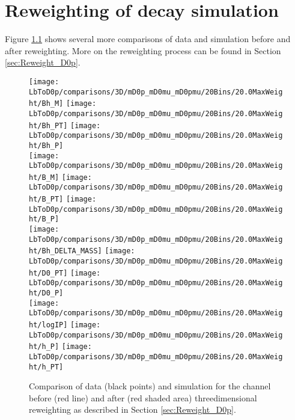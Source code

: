 \chapter{Reweighting of \LbToDpmunuX decay simulation}
\label{app:Reweight_D0p}
Figure \ref{fig:reweight_D0p_app} shows several more comparisons of data and simulation before and after reweighting.
More on the reweighting process can be found in Section \ref{sec:Reweight_D0p}.
\begin{figure}[hptb]
    \centering
	\texttt{[image: LbToD0p/comparisons/3D/mD0p\_mD0mu\_mD0pmu/20Bins/20.0MaxWeight/Bh\_M]}
	\texttt{[image: LbToD0p/comparisons/3D/mD0p\_mD0mu\_mD0pmu/20Bins/20.0MaxWeight/Bh\_PT]}
	\texttt{[image: LbToD0p/comparisons/3D/mD0p\_mD0mu\_mD0pmu/20Bins/20.0MaxWeight/Bh\_P]}          \\
	\texttt{[image: LbToD0p/comparisons/3D/mD0p\_mD0mu\_mD0pmu/20Bins/20.0MaxWeight/B\_M]}           
	\texttt{[image: LbToD0p/comparisons/3D/mD0p\_mD0mu\_mD0pmu/20Bins/20.0MaxWeight/B\_PT]}
	\texttt{[image: LbToD0p/comparisons/3D/mD0p\_mD0mu\_mD0pmu/20Bins/20.0MaxWeight/B\_P]}           \\
    \texttt{[image: LbToD0p/comparisons/3D/mD0p\_mD0mu\_mD0pmu/20Bins/20.0MaxWeight/Bh\_DELTA\_MASS]}
	\texttt{[image: LbToD0p/comparisons/3D/mD0p\_mD0mu\_mD0pmu/20Bins/20.0MaxWeight/D0\_PT]}
	\texttt{[image: LbToD0p/comparisons/3D/mD0p\_mD0mu\_mD0pmu/20Bins/20.0MaxWeight/D0\_P]}          \\
    \texttt{[image: LbToD0p/comparisons/3D/mD0p\_mD0mu\_mD0pmu/20Bins/20.0MaxWeight/logIP]}
	\texttt{[image: LbToD0p/comparisons/3D/mD0p\_mD0mu\_mD0pmu/20Bins/20.0MaxWeight/h\_P]}
	\texttt{[image: LbToD0p/comparisons/3D/mD0p\_mD0mu\_mD0pmu/20Bins/20.0MaxWeight/h\_PT]}
	\caption{Comparison of data (black points) and simulation for the \LbToDpmunuX channel before (red line) and after (red shaded area) threedimensional reweighting as described in Section \ref{sec:Reweight_D0p}.}
    \label{fig:reweight_D0p_app}
\end{figure}

